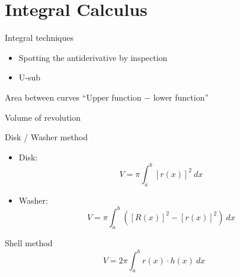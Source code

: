 \documentclass{beamer}
\begin{document}
\section{Integral Calculus}

\begin{frame}[label={sec:orgddabff4}]{Integral techniques}
\begin{itemize}
\item Spotting the antiderivative by inspection
\item U-sub
\end{itemize}
\end{frame}

\begin{frame}{Area between curves}
  ``Upper function $-$ lower function''
\end{frame}

\begin{frame}[label={sec:org7499686}]{Volume of revolution}
\begin{block}{Disk / Washer method}
\begin{itemize}
\item Disk: 
\[
    V = \pi \int_a^b [r(x)]^2\ dx
    \]
\item Washer: 
\[
     V = \pi \int_a^b \left( [R(x)]^2 - [r(x)]^2 \right) \ dx
     \]
\end{itemize}
\end{block}
\begin{block}{Shell method}
\[
   V = 2\pi \int_a^b r(x) \cdot h(x) \ dx
   \]
\end{block}
\end{frame}
\end{document}
